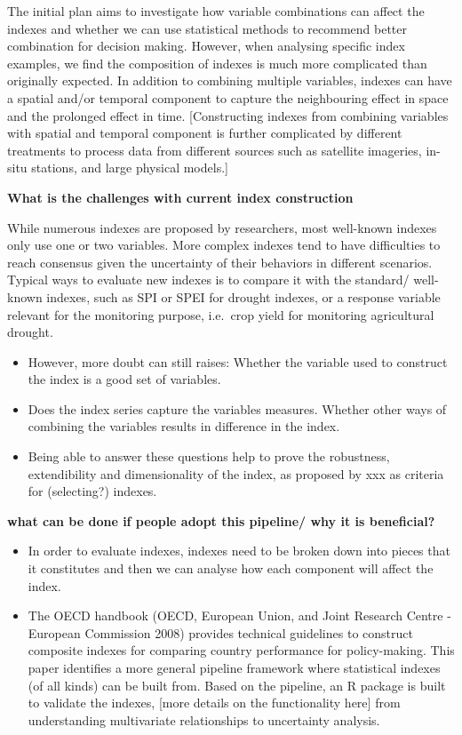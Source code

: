 \documentclass[
]{interact}
\providecommand{\tightlist}{%
  \setlength{\itemsep}{0pt}\setlength{\parskip}{0pt}}\usepackage{longtable,booktabs,array}
\begin{document}
The initial plan aims to investigate how variable combinations can
affect the indexes and whether we can use statistical methods to
recommend better combination for decision making. However, when
analysing specific index examples, we find the composition of indexes is
much more complicated than originally expected. In addition to combining
multiple variables, indexes can have a spatial and/or temporal component
to capture the neighbouring effect in space and the prolonged effect in
time. {[}Constructing indexes from combining variables with spatial and
temporal component is further complicated by different treatments to
process data from different sources such as satellite imageries, in-situ
stations, and large physical models.{]}

\textbf{What is the challenges with current index construction}

While numerous indexes are proposed by researchers, most well-known
indexes only use one or two variables. More complex indexes tend to have
difficulties to reach consensus given the uncertainty of their behaviors
in different scenarios. Typical ways to evaluate new indexes is to
compare it with the standard/ well-known indexes, such as SPI or SPEI
for drought indexes, or a response variable relevant for the monitoring
purpose, i.e.~crop yield for monitoring agricultural drought.

\begin{itemize}
\tightlist
\item
  However, more doubt can still raises: Whether the variable used to
  construct the index is a good set of variables.
\item
  Does the index series capture the variables measures. Whether other
  ways of combining the variables results in difference in the index.
\item
  Being able to answer these questions help to prove the robustness,
  extendibility and dimensionality of the index, as proposed by xxx as
  criteria for (selecting?) indexes.
\end{itemize}

\textbf{what can be done if people adopt this pipeline/ why it is
beneficial?}

\begin{itemize}
\tightlist
\item
  In order to evaluate indexes, indexes need to be broken down into
  pieces that it constitutes and then we can analyse how each component
  will affect the index.
\item
  The OECD handbook (OECD, European Union, and Joint Research Centre -
  European Commission 2008) provides technical guidelines to construct
  composite indexes for comparing country performance for policy-making.
  This paper identifies a more general pipeline framework where
  statistical indexes (of all kinds) can be built from. Based on the
  pipeline, an R package is built to validate the indexes, {[}more
  details on the functionality here{]} from understanding multivariate
  relationships to uncertainty analysis.
\end{itemize}
\end{document}
